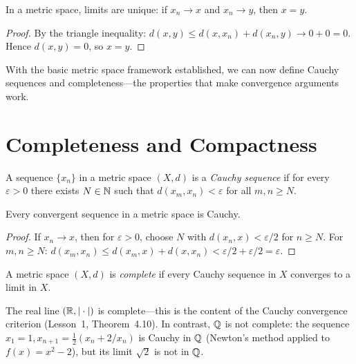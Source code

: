 \documentclass[11pt,a4paper]{article}
\begin{document}
\begin{proposition}
\label{prop:unique_limit}
In a metric space, limits are unique: if $x_n \to x$ and $x_n \to y$,
then $x = y$.
\end{proposition}

\begin{proof}
By the triangle inequality: $d(x, y) \le d(x, x_n) + d(x_n, y) \to
0 + 0 = 0$. Hence $d(x, y) = 0$, so $x = y$.
\end{proof}

With the basic metric space framework established, we can now define
Cauchy sequences and completeness---the properties that make convergence
arguments work.

\section{Completeness and Compactness}
\label{sec:completeness}

\begin{definition}
\label{def:cauchy_metric}
A sequence $\{x_n\}$ in a metric space $(X, d)$ is a \emph{Cauchy
sequence} if for every $\varepsilon > 0$ there exists $N \in \mathbb{N}$ such
that $d(x_m, x_n) < \varepsilon$ for all $m, n \ge N$.
\end{definition}

\begin{proposition}
\label{prop:convergent_is_cauchy}
Every convergent sequence in a metric space is Cauchy.
\end{proposition}

\begin{proof}
If $x_n \to x$, then for $\varepsilon > 0$, choose $N$ with
$d(x_n, x) < \varepsilon/2$ for $n \ge N$. For $m, n \ge N$:
$d(x_m, x_n) \le d(x_m, x) + d(x, x_n) < \varepsilon/2 +
\varepsilon/2 = \varepsilon$.
\end{proof}

\begin{definition}
\label{def:complete}
A metric space $(X, d)$ is \emph{complete} if every Cauchy sequence in
$X$ converges to a limit in $X$.
\end{definition}

\begin{example}
\label{ex:R_complete}
The real line $(\mathbb{R}, |\cdot|)$ is complete---this is the content of the
Cauchy convergence criterion (Lesson~1, Theorem~4.10). In contrast,
$\mathbb{Q}$ is not complete: the sequence $x_1 = 1, x_{n+1} =
\frac{1}{2}(x_n + 2/x_n)$ is Cauchy in $\mathbb{Q}$ (Newton's method applied
to $f(x) = x^2 - 2$), but its limit $\sqrt{2}$ is not in $\mathbb{Q}$.
\end{example}
\end{document}
